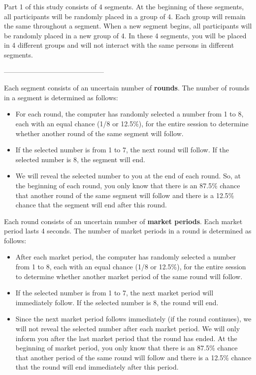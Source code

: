 \documentclass[11pt]{article}
\begin{document}
Part 1 of this study consists of 4 segments. At the beginning of these segments, all participants will be randomly placed in a group of 4. Each group will remain the same throughout a segment. When a new segment begins, all participants will be randomly placed in a new group of 4. In these 4 segments, you will be placed in 4 different groups and will not interact with the same persons in different segments.

\vspace{0.2in}
\begin{center}
--------------------------------------------
\end{center}
\vspace{0.2in}

Each segment consists of an uncertain number of \textbf{rounds}. The number of rounds in a segment is determined as follows: 
\begin{itemize}
    \item   For each round, the computer has randomly selected a number from 1 to 8, each with an equal chance (1/8 or 12.5\%), for the entire session to determine whether another round of the same segment will follow. 
    \item 	If the selected number is from 1 to 7, the next round will follow. If the selected number is 8, the segment will end.
    \item 	We will reveal the selected number to you at the end of each round. So, at the beginning of each round, you only know that there is an 87.5\% chance that another round of the same segment will follow and there is a 12.5\% chance that the segment will end after this round. 
\end{itemize}


\newpage

Each round consists of an uncertain number of \textbf{market periods}. Each market period lasts 4 seconds. The number of market periods in a round is determined as follows: 
\begin{itemize}
    \item   After each market period, the computer has randomly selected a number from 1 to 8, each with an equal chance (1/8 or 12.5\%), for the entire session to determine whether another market period of the same round will follow. 
    \item 	If the selected number is from 1 to 7, the next market period will immediately follow. If the selected number is 8, the round will end.
    \item 	Since the next market period follows immediately (if the round continues), we will not reveal the selected number after each market period. We will only inform you after the last market period that the round has ended. At the beginning of market period, you only know that there is an 87.5\% chance that another period of the same round will follow and there is a 12.5\% chance that the round will end immediately after this period. 
\end{itemize}
\end{document}
